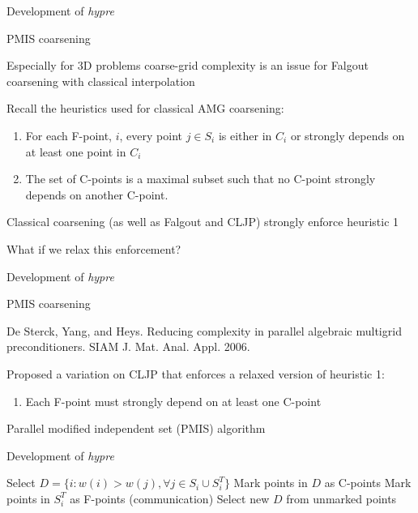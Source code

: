 \documentclass[18pt,xcolor=table]{beamer}
\begin{document}
\begin{frame}{Development of \emph{hypre}}
\begin{block}{PMIS coarsening}
\bit
\item Especially for 3D problems coarse-grid complexity is an issue for Falgout coarsening with classical interpolation
\item Recall the heuristics used for classical AMG coarsening:
\begin{enumerate}
\item For each F-point, $i$, every point $j\in S_i$ is either in $C_i$ or strongly depends on at least one point in $C_i$
\item The set of C-points is a maximal subset such that no C-point strongly depends on another C-point.
\end{enumerate}
\item Classical coarsening (as well as Falgout and CLJP) strongly enforce heuristic 1
\item What if we relax this enforcement?
\eit
\end{block}
\end{frame}

\begin{frame}{Development of \emph{hypre}}
\begin{block}{PMIS coarsening}
\bit
\item De Sterck, Yang, and Heys. Reducing complexity in parallel algebraic multigrid preconditioners. SIAM J. Mat. Anal. Appl. 2006.
\item Proposed a variation on CLJP that enforces a relaxed version of heuristic 1:
\begin{enumerate}
\item Each F-point must strongly depend on at least one C-point
\end{enumerate}
\item Parallel modified independent set (PMIS) algorithm
\eit
\end{block}
\end{frame}

\begin{frame}{Development of \emph{hypre}}
\begin{algorithm}[H]
\caption{PMIS coarsening}
\begin{algorithmic}
\State Select $D = \{i : w(i)>w(j) , \forall j\in S_i\cup S_i^T\}$
\State Mark points in $D$ as C-points
   \State Mark points in $S_i^T$ as F-points (communication)
\EndFor
\State Select new $D$ from unmarked points
\EndWhile
\end{algorithmic}
\end{algorithm}
\end{frame}
\end{document}
